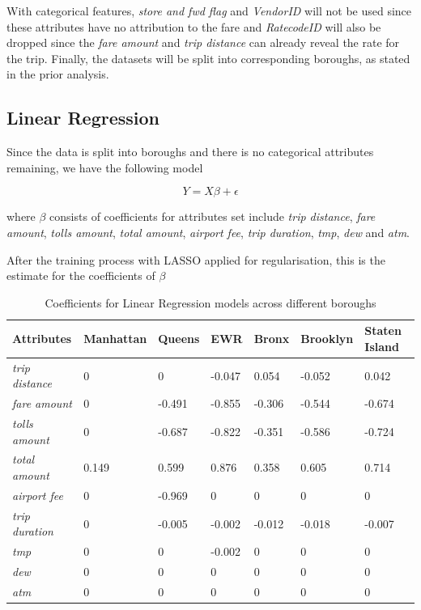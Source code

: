 \documentclass[11pt]{article}
\begin{document}
With categorical features, \textit{store and fwd flag} and \textit{VendorID} will not be used since these attributes have no attribution to the fare and \textit{RatecodeID} will also be dropped since the \textit{fare amount} and \textit{trip distance} can already reveal the rate for the trip. Finally, the datasets will be split into corresponding boroughs, as stated in the prior analysis.

\subsection{Linear Regression}

Since the data is split into boroughs and there is no categorical attributes remaining, we have the following model

\begin{equation}
    Y = X\beta + \epsilon
\end{equation}

where $\beta$ consists of coefficients for attributes set include \textit{trip distance}, \textit{fare amount}, \textit{tolls amount}, \textit{total amount}, \textit{airport fee}, \textit{trip duration}, \textit{tmp}, \textit{dew} and \textit{atm}. 

After the training process with LASSO applied for regularisation, this is the estimate for the coefficients of $\beta$

\begin{table} [h!]
\begin{center}
\begin{tabular}{|m{2.5cm}||m{2cm}|m{1.5cm}|m{1.5cm}|m{1.5cm}|m{2cm}|m{2.5cm}|}
\hline
Attributes & Manhattan & Queens & EWR & Bronx & Brooklyn & Staten Island \\
\hline
\textit{trip distance} & 0 & 0 & -0.047 & 0.054 & -0.052 & 0.042 \\
\textit{fare amount}   & 0 & -0.491 & -0.855 & -0.306 & -0.544 & -0.674 \\
\textit{tolls amount}  & 0 & -0.687 & -0.822 & -0.351 & -0.586 & -0.724 \\
\textit{total amount}  & 0.149 & 0.599 & 0.876 & 0.358 & 0.605 & 0.714 \\
\textit{airport fee}   & 0 & -0.969 & 0 & 0 & 0 & 0 \\
\textit{trip duration} & 0 & -0.005 & -0.002 & -0.012 & -0.018 & -0.007 \\
\textit{tmp} & 0 & 0 & -0.002 & 0 & 0 & 0 \\
\textit{dew} & 0 & 0 & 0 & 0 & 0 & 0 \\
\textit{atm} & 0 & 0 & 0 & 0 & 0 & 0 \\
\hline
\end{tabular}
\caption{Coefficients for Linear Regression models across different boroughs}
\end{center}
\end{table}
\end{document}
